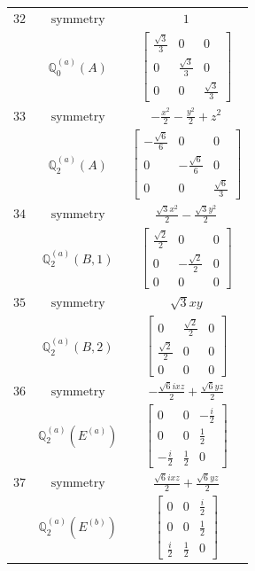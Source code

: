 \documentclass[fleqn,8pt,landscape]{jsarticle}
\begin{document}
\begin{longtable}{ccc}
$ 32 $ & $ \text{symmetry} $ & $ 1 $ \\
$  $ & $ \mathbb{Q}_{0}^{(a)}(A) $ & $ \begin{bmatrix} \frac{\sqrt{3}}{3} & 0 & 0 \\ 0 & \frac{\sqrt{3}}{3} & 0 \\ 0 & 0 & \frac{\sqrt{3}}{3} \end{bmatrix} $ \\ \hline
$ 33 $ & $ \text{symmetry} $ & $ - \frac{x^{2}}{2} - \frac{y^{2}}{2} + z^{2} $ \\
$  $ & $ \mathbb{Q}_{2}^{(a)}(A) $ & $ \begin{bmatrix} - \frac{\sqrt{6}}{6} & 0 & 0 \\ 0 & - \frac{\sqrt{6}}{6} & 0 \\ 0 & 0 & \frac{\sqrt{6}}{3} \end{bmatrix} $ \\ \hline
$ 34 $ & $ \text{symmetry} $ & $ \frac{\sqrt{3} x^{2}}{2} - \frac{\sqrt{3} y^{2}}{2} $ \\
$  $ & $ \mathbb{Q}_{2}^{(a)}(B,1) $ & $ \begin{bmatrix} \frac{\sqrt{2}}{2} & 0 & 0 \\ 0 & - \frac{\sqrt{2}}{2} & 0 \\ 0 & 0 & 0 \end{bmatrix} $ \\ \hline
$ 35 $ & $ \text{symmetry} $ & $ \sqrt{3} x y $ \\
$  $ & $ \mathbb{Q}_{2}^{(a)}(B,2) $ & $ \begin{bmatrix} 0 & \frac{\sqrt{2}}{2} & 0 \\ \frac{\sqrt{2}}{2} & 0 & 0 \\ 0 & 0 & 0 \end{bmatrix} $ \\ \hline
$ 36 $ & $ \text{symmetry} $ & $ - \frac{\sqrt{6} i x z}{2} + \frac{\sqrt{6} y z}{2} $ \\
$  $ & $ \mathbb{Q}_{2}^{(a)}(E^{(a)}) $ & $ \begin{bmatrix} 0 & 0 & - \frac{i}{2} \\ 0 & 0 & \frac{1}{2} \\ - \frac{i}{2} & \frac{1}{2} & 0 \end{bmatrix} $ \\ \hline
$ 37 $ & $ \text{symmetry} $ & $ \frac{\sqrt{6} i x z}{2} + \frac{\sqrt{6} y z}{2} $ \\
$  $ & $ \mathbb{Q}_{2}^{(a)}(E^{(b)}) $ & $ \begin{bmatrix} 0 & 0 & \frac{i}{2} \\ 0 & 0 & \frac{1}{2} \\ \frac{i}{2} & \frac{1}{2} & 0 \end{bmatrix} $ \\ \hline

\end{longtable}
\end{document}
